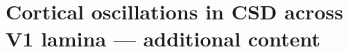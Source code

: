 \chapter{Cortical oscillations in CSD across V1 lamina --- additional content}

\graphicspath{{Chapters/laminar-extra/figs/}}

